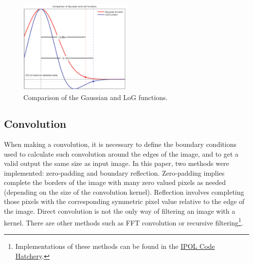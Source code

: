 \documentclass{ipol}
\numberwithin{equation}{section}
\numberwithin{table}{section}
\begin{document}
\begin{figure}
	\centering
	\includegraphics[width=0.5\textwidth]{kernels.pdf}
	\caption{Comparison of the Gaussian and LoG functions.}
	\label{fig:kernels}
\end{figure}


\subsection{Convolution}

When making a convolution, it is necessary to define the boundary conditions used to calculate such convolution 
around the edges of the image, and to get a valid output the same size as input image. In this paper, 
two methods were implemented: zero-padding and boundary reflection. Zero-padding implies complete 
the borders of the image with many zero valued pixels as needed (depending on the size of the convolution 
kernel). Reflection involves completing those pixels with the corresponding symmetric pixel value 
relative to the edge of the image. Direct convolution is not the only way of filtering an image with a kernel. There are other methods such as FFT convolution or recursive filtering\footnote{Implementations of these methods can be found in the \href{https://tools.ipol.im/wiki/author/code/hatchery/}{IPOL Code Hatchery}.}.

\end{document}

